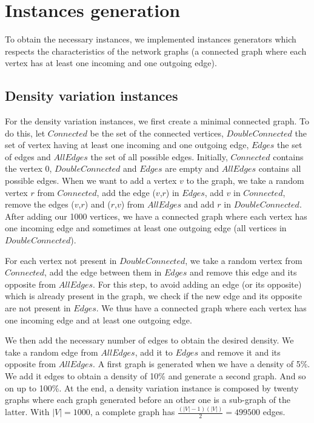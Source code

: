 \section{Instances generation}
To obtain the necessary instances, we implemented instances generators which respects the characteristics of the network graphs (a connected graph where each vertex has at least one incoming and one outgoing edge).

\subsection{Density variation instances}
For the density variation instances, we first create a minimal connected graph. To do this, let $Connected$ be the set of the connected vertices, $DoubleConnected$ the set of vertex having at least one incoming and one outgoing edge, $Edges$ the set of edges and $AllEdges$ the set of all possible edges. Initially, $Connected$ contains the vertex 0, $DoubleConnected$ and $Edges$ are empty and $AllEdges$ contains all possible edges. When we want to add a vertex $v$ to the graph, we take a random vertex $r$ from $Connected$, add the edge ($v$,$r$) in $Edges$, add $v$ in $Connected$, remove the edges ($v$,$r$) and ($r$,$v$) from $AllEdges$ and add $r$ in $DoubleConnected$. After adding our 1000 vertices, we have a connected graph where each vertex has one incoming edge and sometimes at least one outgoing edge (all vertices in $DoubleConnected$).

For each vertex not present in $DoubleConnected$, we take a random vertex from $Connected$, add the edge between them in $Edges$ and remove this edge and its opposite from $AllEdges$. For this step, to avoid adding an edge (or its opposite) which is already present in the graph, we check if the new edge and its opposite are not present in $Edges$. We thus have a connected graph where each vertex has one incoming edge and at least one outgoing edge.

We then add the necessary number of edges to obtain the desired density. We take a random edge from $AllEdges$, add it to $Edges$ and remove it and its opposite from $AllEdges$. A first graph is generated when we have a density of 5\%. We add it edges to obtain a density of 10\% and generate a second graph. And so on up to 100\%. At the end, a density variation instance is composed by twenty graphs where each graph generated before an other one is a sub-graph of the latter. With $|V|=1000$, a complete graph has $\frac{(|V|-1)(|V|)}{2} = 499500$ edges.

